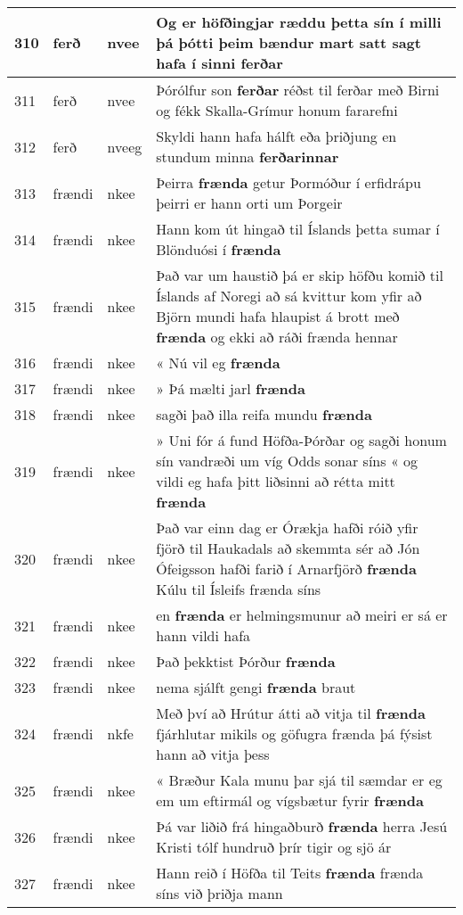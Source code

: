 \documentclass{article}
\begin{document}
\begin{longtable}{p{1cm}|p{1cm}|p{1cm}|p{13cm}}
\hline
310&ferð&nvee&Og er höfðingjar ræddu þetta sín í milli þá þótti þeim bændur mart satt sagt hafa í sinni \textbf{ferðar} \\
\hline
311&ferð&nvee&Þórólfur son \textbf{ferðar} réðst til ferðar með Birni og fékk Skalla-Grímur honum fararefni\\
\hline
312&ferð&nveeg&Skyldi hann hafa hálft eða þriðjung en stundum minna \textbf{ferðarinnar} \\
\hline
313&frændi&nkee&Þeirra \textbf{frænda} getur Þormóður í erfidrápu þeirri er hann orti um Þorgeir\\
\hline
314&frændi&nkee&Hann kom út hingað til Íslands þetta sumar í Blönduósi í \textbf{frænda} \\
\hline
315&frændi&nkee&Það var um haustið þá er skip höfðu komið til Íslands af Noregi að sá kvittur kom yfir að Björn mundi hafa hlaupist á brott með \textbf{frænda} og ekki að ráði frænda hennar\\
\hline
316&frændi&nkee&« Nú vil eg \textbf{frænda} \\
\hline
317&frændi&nkee&» Þá mælti jarl \textbf{frænda} \\
\hline
318&frændi&nkee&sagði það illa reifa mundu \textbf{frænda} \\
\hline
319&frændi&nkee&» Uni fór á fund Höfða-Þórðar og sagði honum sín vandræði um víg Odds sonar síns « og vildi eg hafa þitt liðsinni að rétta mitt \textbf{frænda} \\
\hline
320&frændi&nkee&Það var einn dag er Órækja hafði róið yfir fjörð til Haukadals að skemmta sér að Jón Ófeigsson hafði farið í Arnarfjörð \textbf{frænda} Kúlu til Ísleifs frænda síns\\
\hline
321&frændi&nkee&en \textbf{frænda} er helmingsmunur að meiri er sá er hann vildi hafa\\
\hline
322&frændi&nkee&Það þekktist Þórður \textbf{frænda} \\
\hline
323&frændi&nkee&nema sjálft gengi \textbf{frænda} braut\\
\hline
324&frændi&nkfe&Með því að Hrútur átti að vitja til \textbf{frænda} fjárhlutar mikils og göfugra frænda þá fýsist hann að vitja þess\\
\hline
325&frændi&nkee&« Bræður Kala munu þar sjá til sæmdar er eg em um eftirmál og vígsbætur fyrir \textbf{frænda} \\
\hline
326&frændi&nkee&Þá var liðið frá hingaðburð \textbf{frænda} herra Jesú Kristi tólf hundruð þrír tigir og sjö ár\\
\hline
327&frændi&nkee&Hann reið í Höfða til Teits \textbf{frænda} frænda síns við þriðja mann\\

\end{longtable}
\end{document}
